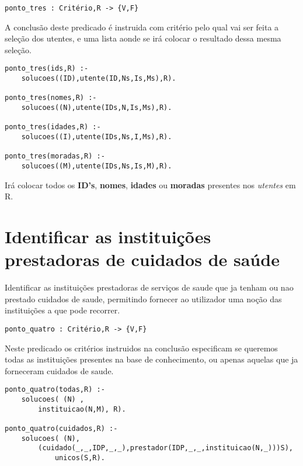 \documentclass{report}
\def\titulo#1{\section{#1}}
\begin{document}
\begin{verbatim}
ponto_tres : Critério,R -> {V,F}
\end{verbatim}

A conclusão deste predicado é instruida com critério pelo qual vai ser feita a seleção dos utentes, e uma lista aonde se irá colocar o resultado dessa mesma seleção.

\begin{verbatim}
ponto_tres(ids,R) :- 
    solucoes((ID),utente(ID,Ns,Is,Ms),R).

ponto_tres(nomes,R) :- 
    solucoes((N),utente(IDs,N,Is,Ms),R).

ponto_tres(idades,R) :- 
    solucoes((I),utente(IDs,Ns,I,Ms),R).

ponto_tres(moradas,R) :- 
    solucoes((M),utente(IDs,Ns,Is,M),R).
\end{verbatim}

Irá colocar todos os \textbf{ID's}, \textbf{nomes}, \textbf{idades} ou \textbf{moradas} presentes nos \textit{utentes} em R.
























\titulo{Identificar as instituições prestadoras de cuidados de saúde}

Identificar as instituições prestadoras de serviços de saude que ja tenham ou nao prestado cuidados de saude, permitindo fornecer ao utilizador uma noção das instituições a que pode recorrer.


\begin{verbatim}
ponto_quatro : Critério,R -> {V,F}
\end{verbatim}

Neste predicado os critérios instruidos na conclusão especificam se queremos todas as instituições presentes na base de conhecimento, ou apenas aquelas que ja forneceram cuidados de saude.

\begin{verbatim}
ponto_quatro(todas,R) :- 
    solucoes( (N) , 
        instituicao(N,M), R).

ponto_quatro(cuidados,R) :- 
    solucoes( (N), 
        (cuidado(_,_,IDP,_,_),prestador(IDP,_,_,instituicao(N,_)))S),
            unicos(S,R).
\end{verbatim}
\end{document}

